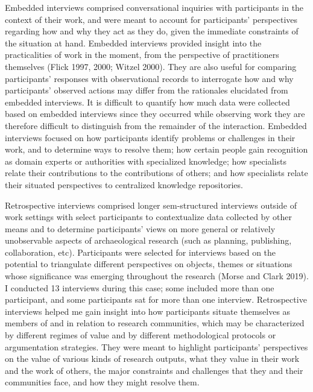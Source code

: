 \documentclass[
]{article}
\begin{document}
Embedded interviews comprised conversational inquiries with participants
in the context of their work, and were meant to account for
participants' perspectives regarding how and why they act as they do,
given the immediate constraints of the situation at hand. Embedded
interviews provided insight into the practicalities of work in the
moment, from the perspective of practitioners themselves (Flick 1997,
2000; Witzel 2000). They are also useful for comparing participants'
responses with observational records to interrogate how and why
participants' observed actions may differ from the rationales elucidated
from embedded interviews. It is difficult to quantify how much data were
collected based on embedded interviews since they occurred while
observing work they are therefore difficult to distinguish from the
remainder of the interaction. Embedded interviews focused on how
participants identify problems or challenges in their work, and to
determine ways to resolve them; how certain people gain recognition as
domain experts or authorities with specialized knowledge; how
specialists relate their contributions to the contributions of others;
and how specialists relate their situated perspectives to centralized
knowledge repositories.

Retrospective interviews comprised longer sem-structured interviews
outside of work settings with select participants to contextualize data
collected by other means and to determine participants' views on more
general or relatively unobservable aspects of archaeological research
(such as planning, publishing, collaboration, etc). Participants were
selected for interviews based on the potential to triangulate different
perspectives on objects, themes or situations whose significance was
emerging throughout the research (Morse and Clark 2019). I conducted 13
interviews during this case; some included more than one participant,
and some participants sat for more than one interview. Retrospective
interviews helped me gain insight into how participants situate
themselves as members of and in relation to research communities, which
may be characterized by different regimes of value and by different
methodological protocols or argumentation strategies. They were meant to
highlight participants' perspectives on the value of various kinds of
research outputs, what they value in their work and the work of others,
the major constraints and challenges that they and their communities
face, and how they might resolve them.
\end{document}
